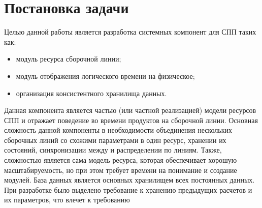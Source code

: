 \section{Постановка задачи}
Целью данной работы является разработка системных компонент для СПП таких как:
\begin{itemize}
	\item модуль ресурса сборочной линии;
	\item модуль отображения логического времени на физическое;
	\item организация консистентного хранилища данных.
\end{itemize}

Данная компонента является частью (или частной реализацией) модели ресурсов СПП и отражает поведение во времени продуктов на сборочной линии. Основная сложность данной компоненты в необходимости объединения нескольких сборочных линий со схожими параметрами в один ресурс, хранении их состояний, синхронизации между  и распределении  по линиям. Также, сложностью является сама модель ресурса, которая обеспечивает хорошую масштабируемость, но при этом требует времени на понимание и создание модулей.
База данных является основных хранилищем всех постоянных  данных. При разработке было выделено требование к хранению  предыдущих расчетов и их параметров, что влечет к требованию  